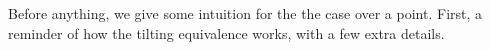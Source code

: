 \documentclass{article}
\begin{document}
Before anything, we give some intuition for the the case over a point.
First, a reminder of how the tilting equivalence works,
with a few extra details.
\end{document}
